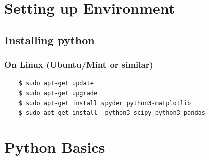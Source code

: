 \documentclass[12pt, aspectratio=169]{beamer}
\begin{document}

\section{Setting up Environment}
\subsection{Installing python}
\begin{frame}[fragile]
  \frametitle{On Linux \small{(Ubuntu/Mint or similar)}}
  \begin{verbatim}
    $ sudo apt-get update 
    $ sudo apt-get upgrade 
    $ sudo apt-get install spyder python3-matplotlib
    $ sudo apt-get install  python3-scipy python3-pandas
\end{verbatim}
\end{frame}



\section{Python Basics}
\end{document}
